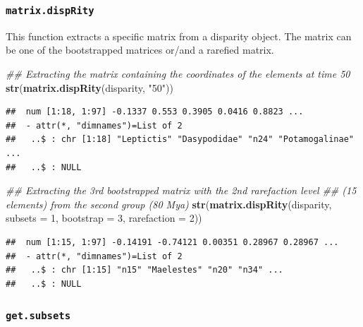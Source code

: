 \documentclass[]{book}
\newenvironment{Shaded}{\begin{snugshade}}{\end{snugshade}}
\newcommand{\CommentTok}[1]{\textcolor[rgb]{0.56,0.35,0.01}{\textit{#1}}}
\newcommand{\DataTypeTok}[1]{\textcolor[rgb]{0.13,0.29,0.53}{#1}}
\newcommand{\DecValTok}[1]{\textcolor[rgb]{0.00,0.00,0.81}{#1}}
\newcommand{\KeywordTok}[1]{\textcolor[rgb]{0.13,0.29,0.53}{\textbf{#1}}}
\newcommand{\NormalTok}[1]{#1}
\newcommand{\StringTok}[1]{\textcolor[rgb]{0.31,0.60,0.02}{#1}}
\begin{document}
\hypertarget{matrix.disprity}{%
\subsubsection{\texorpdfstring{\texttt{matrix.dispRity}}{matrix.dispRity}}\label{matrix.disprity}}

This function extracts a specific matrix from a disparity object.
The matrix can be one of the bootstrapped matrices or/and a rarefied matrix.

\begin{Shaded}
\begin{Highlighting}[]
\CommentTok{## Extracting the matrix containing the coordinates of the elements at time 50}
\KeywordTok{str}\NormalTok{(}\KeywordTok{matrix.dispRity}\NormalTok{(disparity, }\StringTok{"50"}\NormalTok{))}
\end{Highlighting}
\end{Shaded}

\begin{verbatim}
##  num [1:18, 1:97] -0.1337 0.553 0.3905 0.0416 0.8823 ...
##  - attr(*, "dimnames")=List of 2
##   ..$ : chr [1:18] "Leptictis" "Dasypodidae" "n24" "Potamogalinae" ...
##   ..$ : NULL
\end{verbatim}

\begin{Shaded}
\begin{Highlighting}[]
\CommentTok{## Extracting the 3rd bootstrapped matrix with the 2nd rarefaction level}
\CommentTok{## (15 elements) from the second group (80 Mya)}
\KeywordTok{str}\NormalTok{(}\KeywordTok{matrix.dispRity}\NormalTok{(disparity, }\DataTypeTok{subsets =} \DecValTok{1}\NormalTok{, }\DataTypeTok{bootstrap =} \DecValTok{3}\NormalTok{, }\DataTypeTok{rarefaction =} \DecValTok{2}\NormalTok{))}
\end{Highlighting}
\end{Shaded}

\begin{verbatim}
##  num [1:15, 1:97] -0.14191 -0.74121 0.00351 0.28967 0.28967 ...
##  - attr(*, "dimnames")=List of 2
##   ..$ : chr [1:15] "n15" "Maelestes" "n20" "n34" ...
##   ..$ : NULL
\end{verbatim}

\hypertarget{get.subsets}{%
\subsubsection{\texorpdfstring{\texttt{get.subsets}}{get.subsets}}\label{get.subsets}}
\end{document}
